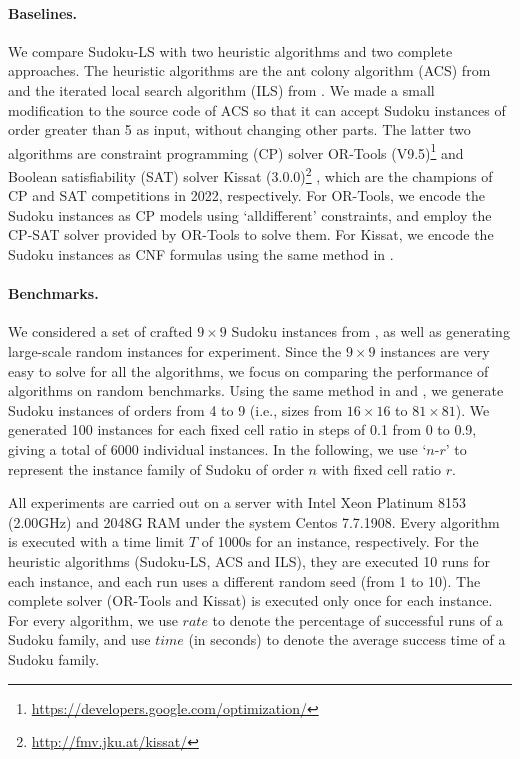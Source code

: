 \documentclass{article}
\begin{document}

\paragraph{Baselines.} We compare Sudoku-LS with two heuristic algorithms and two complete approaches. The heuristic algorithms are the ant colony algorithm (ACS) from \cite{lloyd2020antcolony} and the iterated local search algorithm (ILS) from \cite{musliu2017sudoku}. We made a small modification to the source code of ACS so that it can accept Sudoku instances of order greater than 5 as input, without changing other parts. The latter two algorithms are constraint programming (CP) solver OR-Tools (V9.5)\footnote{\href{https://developers.google.com/optimization/}{https://developers.google.com/optimization/}} and Boolean satisfiability (SAT) solver Kissat (3.0.0)\footnote{\href{http://fmv.jku.at/kissat/}{http://fmv.jku.at/kissat/}} \cite{fleury2020cadical}, which are the champions of CP and SAT competitions in 2022, respectively. For OR-Tools, we encode the Sudoku instances as CP models using `alldifferent' constraints, and employ the CP-SAT solver provided by OR-Tools to solve them. For Kissat, we encode the Sudoku instances as CNF formulas using the same method in \cite{lynce2006sat}. 

\paragraph{Benchmarks.} We considered a set of crafted $9 \times 9$ Sudoku instances from \cite{mantere2008solving}, as well as generating large-scale random instances for experiment. Since the $9 \times 9$ instances are very easy to solve for all the algorithms, we focus on comparing the performance of algorithms on random benchmarks. Using the same method in \cite{lewis2007metaheuristics} and \cite{musliu2017sudoku}, we generate Sudoku instances of orders from 4 to 9 (i.e., sizes from $16 \times 16$ to $81 \times 81$). We generated 100 instances for each fixed cell ratio in steps of 0.1 from 0 to 0.9, giving a total of 6000 individual instances. In the following, we use `$n$-$r$' to represent the instance family of Sudoku of order $n$ with fixed cell ratio $r$.

All experiments are carried out on a server with Intel Xeon Platinum 8153 (2.00GHz) and 2048G RAM under the system Centos 7.7.1908. Every algorithm is executed with a time limit $T$ of 1000s for an instance, respectively. For the heuristic algorithms (Sudoku-LS, ACS and ILS), they are executed 10 runs for each instance, and each run uses a different random seed (from 1 to 10). The complete solver (OR-Tools and Kissat) is executed only once for each instance. For every algorithm, we use $rate$ to denote the percentage of successful runs of a Sudoku family, and use $time$ (in seconds) to denote the average success time of a Sudoku family.
\end{document}
